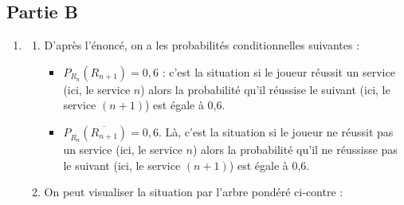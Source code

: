 \subsection*{Partie B}

\begin{enumerate}
	\item \begin{enumerate}
		\item D'après l'énoncé, on a les probabilités conditionnelles suivantes :

		\begin{itemize}[label=$\bullet$]
			\item $P_{R_{n}}\left(R_{n + 1}\right) = 0,6$ : c'est la situation \og si le joueur réussit un service (ici, le service $n$) alors la probabilité qu'il réussise le suivant (ici, le service $(n+1)$) est égale à 0,6\fg{}.
			\item  $P_{\overline{R_{n}}}\left(\overline{R_{n + 1}}\right) = 0,6$. Là, c'est la situation \og si le joueur ne réussit pas un service (ici, le service $n$) alors la probabilité qu'il ne réussisse pas le suivant (ici, le service $(n+1)$) est égale à 0,6\fg{}.
		\end{itemize}

		\item \begin{minipage}[t]{0.4\linewidth}
		On peut visualiser la situation par l'arbre pondéré ci-contre : \end{minipage}
	\hfill
{}
\end{enumerate}
\end{enumerate}
